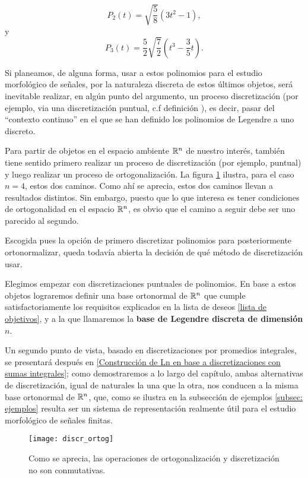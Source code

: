 \[
P_{2}(t) = \sqrt{\frac{5}{8}}\left( 3t^{2}-1 \right),
\]
y
\[
P_{3}(t) = \frac{5}{2} \sqrt{\frac{7}{2}}\left( t^{3}- \frac{3}{5}t\right).
\]

Si planeamos, de alguna forma, usar a estos polinomios
para el estudio morfológico de señales, por la naturaleza
discreta de estos últimos objetos, será
inevitable realizar, en algún punto 
del argumento, un proceso discretización
(por ejemplo, 
via una discretización
puntual, c.f definición ), es decir,
pasar del ``contexto continuo'' en el que se han
definido los polinomios de Legendre a uno discreto.

Para partir de
objetos en el espacio ambiente
$\mathbb{R}^{n}$ de nuestro interés,
también tiene sentido primero realizar
un proceso de discretización (por ejemplo, 
puntual) y luego realizar
un proceso de ortogonalización. La figura
\ref{fig: ortogonalizacion, discretizacion}
ilustra, para el caso $n=4$, estos dos caminos.
Como ahí se aprecia, estos dos caminos llevan 
a resultados distintos. Sin embargo, puesto que lo
que interesa es tener condiciones de ortogonalidad
en el espacio $\mathbb{R}^{n}$, es obvio que 
el camino a seguir debe ser uno parecido al segundo.


Escogida pues la opción de primero 
discretizar polinomios para posteriormente
ortonormalizar, queda todavía abierta
la decisión de qué método de discretización usar.

Elegimos empezar
con discretizaciones puntuales de polinomios.
En base a estos objetos lograremos definir
una base ortonormal de $\mathbb{R}^{n}$ que cumple satisfactoriamente
los requisitos explicados en la lista de deseos
\ref{lista de objetivos}, y a la que llamaremos
la \textbf{base de Legendre discreta de dimensión $n$}.

Un segundo punto de vista, basado
en discretizaciones por promedios integrales,
se presentará después en
\ref{Construcción de Ln en base a discretizaciones con sumas integrales}; 
como demostraremos a lo largo del capítulo, 
ambas alternativas
de discretización, igual de naturales la una que la otra, nos
conducen a la misma base ortonormal de $\mathbb{R}^{n}$,
que, como se ilustra en la subsección de ejemplos
\ref{subsec: ejemplos}
resulta ser un sistema de representación
realmente útil para el estudio morfológico de señales finitas.

\newpage %

\begin{figure}[H]
\centering\captionsetup{format = hang}
	\begin{measuredfigure}
		\label{fig: ortogonalizacion, discretizacion}
		\texttt{[image: discr\_ortog]} 
		\caption{Como se aprecia, las operaciones de
		ortogonalización y discretización no son conmutativas.}
 	\end{measuredfigure}
 \end{figure}